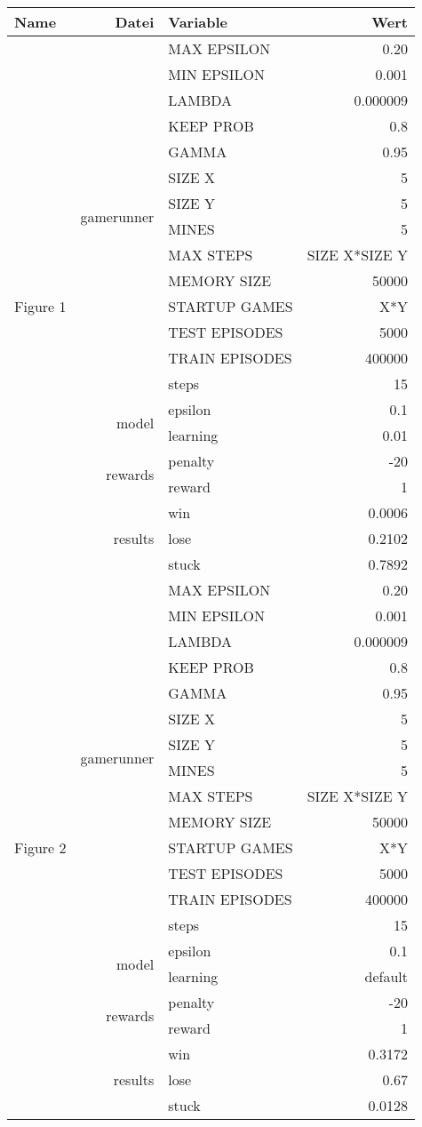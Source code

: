 \documentclass{article}
\begin{document}
\begin{tabularx}{\textwidth}{l|r|X|r}
Name & Datei & Variable & Wert \\
\hline
\multirow{21}{*}{Figure 1} & \multirow{14}{*}{gamerunner} & MAX EPSILON	& 0.20\\
& & MIN EPSILON	& 0.001 \\
& & LAMBDA & 0.000009 \\
& & KEEP PROB & 0.8 \\
& & GAMMA	& 0.95 \\
& & SIZE X & 5 \\
& & SIZE Y & 5 \\
& & MINES & 5 \\
& & MAX STEPS & SIZE X*SIZE Y\\
& & MEMORY SIZE & 50000 \\
& & STARTUP GAMES & X*Y \\
& & TEST EPISODES & 5000 \\
& & TRAIN EPISODES & 400000 \\
& & steps & 15\\\cline{2-4}
& \multirow{2}{*}{model} & epsilon & 0.1\\
& & learning & 0.01 \\\cline{2-4}
& \multirow{2}{*}{rewards} & penalty &-20\\
& & reward& 1\\\cline{2-4}
& \multirow{3}{*}{results} & win & 0.0006\\
& & lose &0.2102\\
& & stuck &0.7892\\
\hline
\hline
\multirow{21}{*}{Figure 2} & \multirow{14}{*}{gamerunner} & MAX EPSILON	& 0.20\\
& & MIN EPSILON	& 0.001 \\
& & LAMBDA & 0.000009 \\
& & KEEP PROB & 0.8 \\
& & GAMMA	& 0.95 \\
& & SIZE X & 5 \\
& & SIZE Y & 5 \\
& & MINES & 5 \\
& & MAX STEPS & SIZE X*SIZE Y\\
& & MEMORY SIZE & 50000 \\
& & STARTUP GAMES & X*Y \\
& & TEST EPISODES & 5000 \\
& & TRAIN EPISODES & 400000 \\
& & steps & 15\\\cline{2-4}
& \multirow{2}{*}{model} & epsilon & 0.1\\
& & learning & default \\\cline{2-4}
& \multirow{2}{*}{rewards} & penalty	&-20\\
& & reward& 1\\\cline{2-4}
& \multirow{3}{*}{results} & win & 0.3172\\
& & lose & 0.67\\
& & stuck & 0.0128\\
\hline
\end{tabularx}
\end{document}
